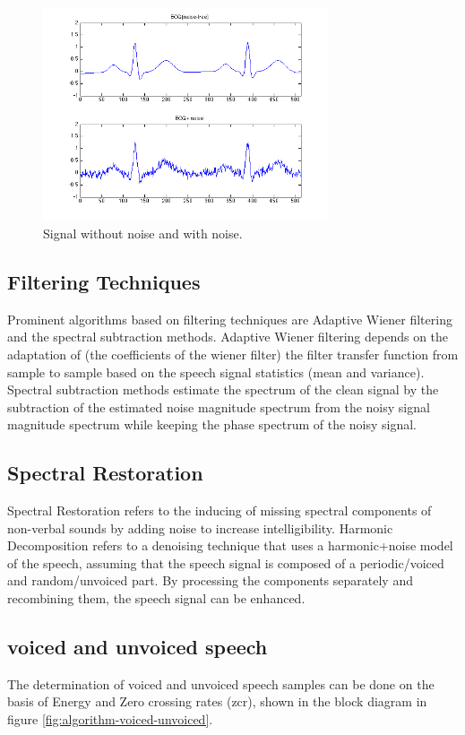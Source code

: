 \documentclass[12pt, a4paper, twoside]{report}
\begin{document}
\begin{figure}[!h]
	\centering
	\includegraphics[width=0.75\textwidth]
	{images/chapter2/signal-noise}
	\caption{Signal without noise and with noise.}
	\label{fig:signal-noise}
\end{figure}

\subsection{Filtering Techniques}
Prominent algorithms based on filtering techniques are Adaptive Wiener filtering and the spectral subtraction methods. Adaptive Wiener filtering depends on the adaptation of (the coefficients of the wiener filter) the filter transfer function from sample to sample based on the speech signal statistics (mean and variance). Spectral subtraction methods estimate the spectrum of the clean signal by the subtraction of the estimated noise magnitude spectrum from the noisy signal magnitude spectrum while keeping the phase spectrum of the noisy signal.

\subsection{Spectral Restoration}
Spectral Restoration refers to the inducing of missing spectral components of non-verbal sounds by adding noise to increase intelligibility. Harmonic Decomposition refers to a denoising technique that uses a harmonic+noise model of the speech, assuming that the speech signal is composed of a periodic/voiced and random/unvoiced part. By processing the components separately and recombining them, the speech signal can be enhanced.

\subsection{voiced and unvoiced speech}
The determination of voiced and unvoiced speech samples can be done on the basis of Energy and Zero crossing rates (\acrshort{zcr}), shown in the block diagram in figure \ref{fig:algorithm-voiced-unvoiced}.
\end{document}
